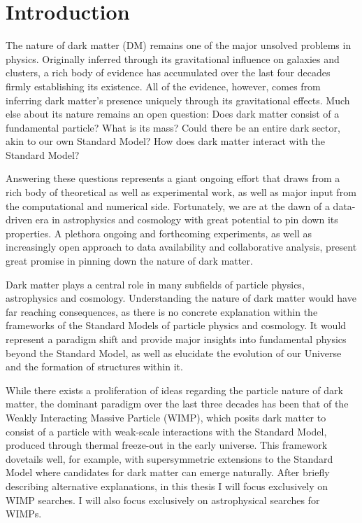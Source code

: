 \chapter{Introduction}
\label{ch:intro}

The nature of dark matter (DM) remains one of the major unsolved problems in physics. Originally inferred through its gravitational influence on galaxies and clusters, a rich body of evidence has accumulated over the last four decades firmly establishing its existence. All of the evidence, however, comes from inferring dark matter's presence uniquely through its gravitational effects. Much else about its nature remains an open question: Does dark matter consist  of a fundamental particle? What is its mass? Could there be an entire dark sector, akin to our own Standard Model? How does dark matter interact with the Standard Model?

Answering these questions represents a giant ongoing effort that draws from a rich body of theoretical as well as experimental work, as well as major input from the computational and numerical side. Fortunately, we are at the dawn of a data-driven era in astrophysics and cosmology with great potential to pin down its properties. A plethora ongoing and forthcoming experiments, as well as increasingly open approach to data availability and collaborative analysis, present great promise in pinning down the nature of dark matter. 

Dark matter plays a central role in many subfields of particle physics, astrophysics and cosmology. Understanding the nature of dark matter would have far reaching consequences, as there is no concrete explanation within the frameworks of the Standard Models of particle physics and cosmology. It would represent a paradigm shift and provide major insights into fundamental physics beyond the Standard Model, as well as elucidate the evolution of our Universe and the formation of structures within it. 

While there exists a proliferation of ideas regarding the particle nature of dark matter, the dominant paradigm over the last three decades has been that of the Weakly Interacting Massive Particle (WIMP), which posits dark matter to consist of a particle with weak-scale interactions with the Standard Model, produced through thermal freeze-out in the early universe. This framework dovetails well, for example, with supersymmetric extensions to the Standard Model where candidates for dark matter can emerge naturally. After briefly describing alternative explanations, in this thesis I will focus exclusively on WIMP searches. I will also focus exclusively on astrophysical searches for WIMPs.

